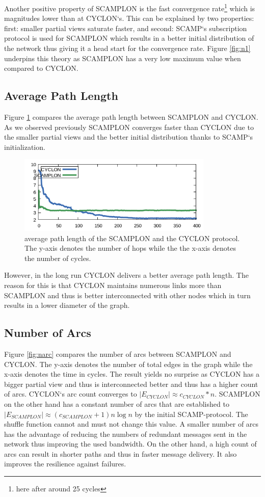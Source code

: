 \documentclass[11pt, english, screen]{report-rd-info}
\begin{document}
Another positive property of SCAMPLON is the fast convergence rate\footnote{here after around 25 cycles} which is magnitudes lower than at CYCLON`s.
This can be explained by two properties: first:  smaller partial views saturate faster, and second: SCAMP`s subscription protocol is used for SCAMPLON which results in a better initial distribution of the network thus giving it a head start for the convergence rate.
Figure \ref{fig:n1} underpins this theory as SCAMPLON has a very low maximum value when compared to CYCLON.

\subsection{Average Path Length}

Figure \ref{fig:np} compares the average path length between SCAMPLON and CYCLON.
As we observed previously SCAMPLON converges faster than CYCLON due to the smaller partial views and the better initial distribution thanks to SCAMP`s initialization.

\begin{figure}[H]
    \centering
    \includegraphics[width=9.3cm]{Images/statistics/scamplon_1000_c3/path_len/p}
    \caption{average path length of the SCAMPLON and the CYCLON protocol. The y-axis denotes the number of hops while the the x-axis denotes the number of cycles.}
    \label{fig:np}
\end{figure}

However, in the long run CYCLON delivers a better average path length.
The reason for this is that CYCLON maintains numerous links more than SCAMPLON and thus is better interconnected with other nodes which in turn results in a lower diameter of the graph.

\subsection{Number of Arcs}

Figure \ref{fig:narc} compares the number of arcs between SCAMPLON and CYCLON.
The y-axis denotes the number of total edges in the graph while the x-axis denotes the time in cycles. 
The result yields no surprise as CYCLON has a bigger partial view and thus is interconnected better and thus has a higher count of arcs.
CYCLON`s arc count converges to $|E_{CYCLON}|\approx c_{CYCLON} * n$.
SCAMPLON on the other hand has a constant number of arcs that are established to $|E_{SCAMPLON}|\approx (c_{SCAMPLON}+1)n\log{n}$ by the initial SCAMP-protocol.
The shuffle function cannot and must not change this value.
A smaller number of arcs has the advantage of reducing the numbers of redundant messages sent in the network thus improving the used bandwidth.
On the other hand, a high count of arcs can result in shorter paths and thus in faster message delivery.
It also improves the resilience against failures.
\end{document}
